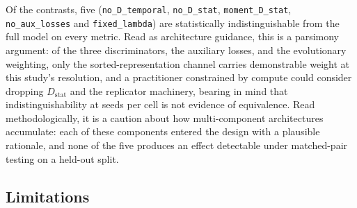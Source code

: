 \documentclass[preprint,12pt]{elsarticle}
\newcommand{\Dstat}{D_{\mathrm{stat}}}
\begin{document}
Of the \protoNContrastsWord{} contrasts, five (\texttt{no\_D\_temporal},
\texttt{no\_D\_stat}, \texttt{moment\_D\_stat}, \texttt{no\_aux\_losses}
and \texttt{fixed\_lambda}) are statistically indistinguishable from the
full model on every metric.  Read as architecture guidance, this is a parsimony
argument: of the three discriminators, the auxiliary losses, and the
evolutionary weighting, only the sorted-representation channel carries
demonstrable weight at this study's resolution, and a practitioner
constrained by compute could consider dropping $\Dstat$ and the replicator
machinery, bearing in mind that indistinguishability at \nSeeds{} seeds
per cell is not evidence of equivalence.  Read methodologically, it is a
caution about how multi-component architectures accumulate: each of
these components entered the design with a plausible rationale, and
none of the five produces an effect detectable under matched-pair
testing on a held-out split.

\subsection{Limitations}
\end{document}
